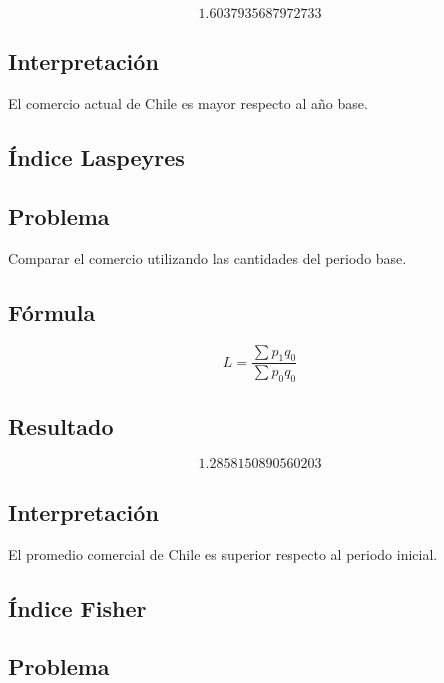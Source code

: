\documentclass[12pt]{article}
\begin{document}
\[
1.6037935687972733
\]

\subsection*{Interpretación}

El comercio actual de Chile es mayor respecto al año base.


\subsection{Índice Laspeyres}

\subsection*{Problema}

Comparar el comercio utilizando las cantidades del periodo base.

\subsection*{Fórmula}

\[
L=\frac{\sum p_1 q_0}{\sum p_0 q_0}
\]

\subsection*{Resultado}

\[
1.2858150890560203
\]

\subsection*{Interpretación}

El promedio comercial de Chile es superior respecto al periodo inicial.


\subsection{Índice Fisher}

\subsection*{Problema}
\end{document}
